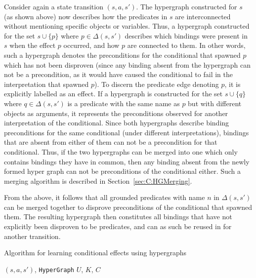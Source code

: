 \documentclass[../Master.tex]{subfiles}
\begin{document}
Consider again a state transition $\left( s, a, s' \right)$. The hypergraph constructed for $s$ (as shown above) now describes how the predicates in $s$ are interconnected without mentioning specific objects or variables. Thus, a hypergraph constructed for the set $s \cup \{ p \}$ where $p \in \Delta \left(s, s' \right)$ describes which bindings were present in $s$ when the effect $p$ occurred, and how $p$ are connected to them. In other words, such a hypergraph denotes the preconditions for the conditional that spawned $p$ which has not been disproven (since any binding absent from the hypergraph can not be a precondition, as it would have caused the conditional to fail in the interpretation that spawned $p$). To discern the predicate edge denoting $p$, it is explicitly labelled as an effect. If a hypergraph is constructed for the set $s \cup \{ q \}$ where $q \in \Delta \left(s,s'\right)$ is a predicate with the same name as $p$ but with different objects as arguments, it represents the preconditions observed for another interpretation of the conditional. Since both hypergraphs describe binding preconditions for the same conditional (under different interpretations), bindings that are absent from either of them can not be a precondition for that conditional. Thus, if the two hypergraphs can be merged into one which only contains bindings they have in common, then any binding absent from the newly formed hyper graph can not be preconditions of the conditional either. Such a merging algorithm is described in Section~\ref{sec:C:HGMerging}.

From the above, it follows that all grounded predicates with name $n$ in $\Delta\left(s, s'\right)$ can be merged together to disprove preconditions of the conditional that spawned them. The resulting hypergraph then constitutes all bindings that have not explicitly been disproven to be predicates, and can as such be reused in for another transition.



\begin{algorithm}
    \caption{Algorithm for learning conditional effects using hypergraphs}\label{algo:CondEffLearn}
    \begin{algorithmic}
         {$\left( s, a, s'\right)$, \texttt{HyperGraph} $U$, $K$, $C$}
                \EndFor
                \EndFor
            \EndFor
        \EndFunction%
    \end{algorithmic}
\end{algorithm}
\end{document}

